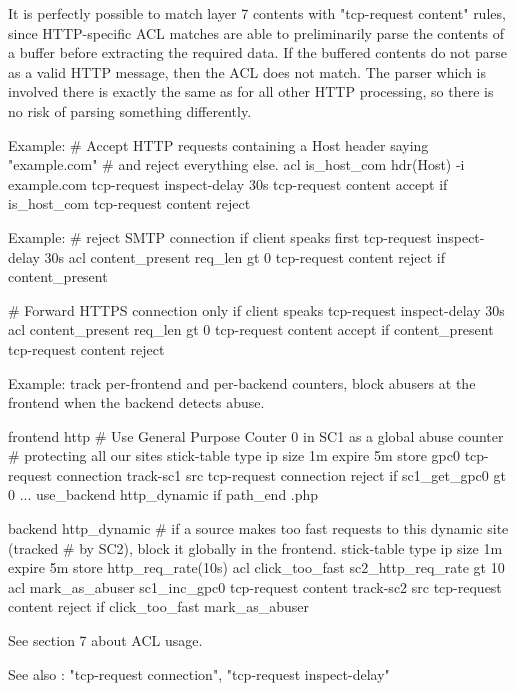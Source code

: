 \begin{description}
\begin{itemize}
  It is perfectly possible to match layer 7 contents with "tcp-request content"
  rules, since HTTP-specific ACL matches are able to preliminarily parse the
  contents of a buffer before extracting the required data. If the buffered
  contents do not parse as a valid HTTP message, then the ACL does not match.
  The parser which is involved there is exactly the same as for all other HTTP
  processing, so there is no risk of parsing something differently.

  Example:
        # Accept HTTP requests containing a Host header saying "example.com"
        # and reject everything else.
        acl is_host_com hdr(Host) -i example.com
        tcp-request inspect-delay 30s
        tcp-request content accept if is_host_com
        tcp-request content reject

  Example:
        # reject SMTP connection if client speaks first
        tcp-request inspect-delay 30s
        acl content_present req_len gt 0
        tcp-request content reject if content_present

        # Forward HTTPS connection only if client speaks
        tcp-request inspect-delay 30s
        acl content_present req_len gt 0
        tcp-request content accept if content_present
        tcp-request content reject

  Example: track per-frontend and per-backend counters, block abusers at the
           frontend when the backend detects abuse.

        frontend http
            # Use General Purpose Couter 0 in SC1 as a global abuse counter
            # protecting all our sites
            stick-table type ip size 1m expire 5m store gpc0
            tcp-request connection track-sc1 src
            tcp-request connection reject if { sc1_get_gpc0 gt 0 }
            ...
            use_backend http_dynamic if { path_end .php }

        backend http_dynamic
            # if a source makes too fast requests to this dynamic site (tracked
            # by SC2), block it globally in the frontend.
            stick-table type ip size 1m expire 5m store http_req_rate(10s)
            acl click_too_fast sc2_http_req_rate gt 10
            acl mark_as_abuser sc1_inc_gpc0
            tcp-request content track-sc2 src
            tcp-request content reject if click_too_fast mark_as_abuser

  See section 7 about ACL usage.

  See also : "tcp-request connection", "tcp-request inspect-delay"



\end{itemize}
\end{description}
